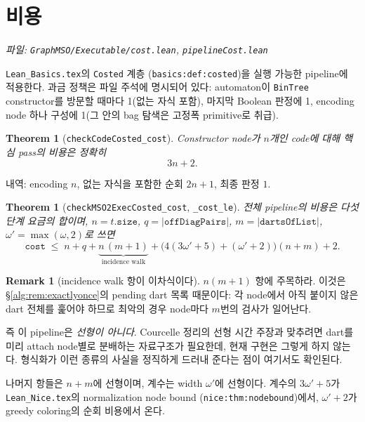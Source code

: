 \documentclass[11pt]{article}
\theoremstyle{definition}
\newtheorem{remark}[definition]{Remark}
\theoremstyle{plain}
\newtheorem{theorem}[definition]{Theorem}
\newcommand{\lean}[1]{\texttt{#1}}
\newcommand{\leanfile}[1]{\texttt{#1}}
\begin{document}
\section{비용}
\label{alg:sec:cost}

\emph{파일: \leanfile{GraphMSO/Executable/cost.lean},
\leanfile{pipelineCost.lean}}

\leanfile{Lean\_Basics.tex}의 \lean{Costed} 계층
(\lean{basics:def:costed})을 실행 가능한 pipeline에 적용한다. 과금 정책은
파일 주석에 명시되어 있다: automaton이 \lean{BinTree} constructor를 방문할
때마다 1(없는 자식 포함), 마지막 Boolean 판정에 1, encoding node 하나 구성에
1(그 안의 bag 탐색은 고정폭 primitive로 취급).

\begin{theorem}[\lean{checkCodeCosted\_cost}]
\label{alg:thm:corecost}
Constructor node가 $n$개인 code에 대해 핵심 pass의 비용은 정확히
\[
  3n + 2.
\]
\end{theorem}

내역: encoding $n$, 없는 자식을 포함한 순회 $2n+1$, 최종 판정 $1$.

\begin{theorem}[\lean{checkMSO2ExecCosted\_cost}, \lean{\_cost\_le}]
\label{alg:thm:pipelinecost}
전체 pipeline의 비용은 다섯 단계 요금의 합이며, $n = t.\lean{size}$,
$q = |\lean{offDiagPairs}|$, $m = |\lean{dartsOfList}|$,
$\omega' = \max(\omega,2)$로 쓰면
\[
  \lean{cost} \;\le\;
    n + q + \underbrace{n\,(m+1)}_{\text{incidence walk}}
    + \bigl(4(3\omega'+5) + (\omega'+2)\bigr)(n+m) + 2.
\]
\end{theorem}

\begin{remark}[incidence walk 항이 이차식이다]
\label{alg:rem:quadratic}
$n(m+1)$ 항에 주목하라. 이것은 \S\ref{alg:rem:exactlyonce}의 pending dart
목록 때문이다: 각 node에서 아직 붙이지 않은 dart 전체를 훑어야 하므로
최악의 경우 node마다 $m$번의 검사가 일어난다.

즉 이 pipeline은 \emph{선형이 아니다}. Courcelle 정리의 선형 시간 주장과
맞추려면 dart를 미리 attach node별로 분배하는 자료구조가 필요한데, 현재
구현은 그렇게 하지 않는다. 형식화가 이런 종류의 사실을 정직하게 드러내
준다는 점이 여기서도 확인된다.

나머지 항들은 $n+m$에 선형이며, 계수는 width $\omega'$에 선형이다. 계수의
$3\omega'+5$가 \leanfile{Lean\_Nice.tex}의 normalization node bound
(\lean{nice:thm:nodebound})에서, $\omega'+2$가 greedy coloring의 순회 비용에서
온다.
\end{remark}
\end{document}
